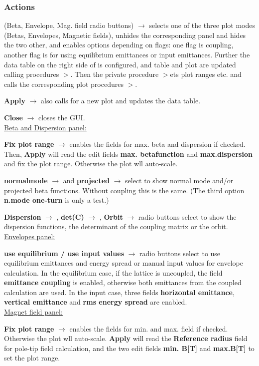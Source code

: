 \documentclass[12pt]{article}
\newcommand\code[1]{{\tt #1}}
\newcommand{\ofld}[1]{\colorbox{black!15}{{\bf #1}}}
\newcommand{\ofldx}[1]{\colorbox{black!15}{(#1)}}
\newcommand\guico[1]{{\color{blue}\code{#1}}}
\newcommand{\unico}[1]{{\color{burntorange}\code{#1}}}
\newcommand{\evcod}[2]{\ofld{#1} $\rightarrow$ \guico{#2}}
\newcommand{\evcodx}[2]{\ofldx{#1} $\rightarrow$ \guico{#2}}
\newcommand{\prcod}[2]{\opauni{#1}$>$\unico{#2}}
\newcommand{\opagui}[1]{\colorbox{blue!20}{{\color{black}\code{#1}}}}
\newcommand{\ogui}[1]{\hyperref[#1]{\opagui{#1}}}
\newcommand{\opauni}[1]{\colorbox{orange!30}{{\color{black}\code{#1}}}}
\newcommand{\act}[1]{\subsubsection*{Actions} #1}
\begin{document}
\act{
\evcodx{Beta, Envelope, Mag. field radio buttons}{rmodClick} selects one of the three plot modes (Betas, Envelopes, Magnetic fields), unhides the corresponding panel and hides the two other, and enables options depending on flags: one flag is coupling, another flag is for using equilibrium emittances or input emittances. Further the data table on the right side of \ogui{opalinop} is configured, and table and plot are updated calling procedures \prcod{linoplib}{InitBetaTab,FillBetaTab}. Then the private procedure \prcod{MakePlot} sets plot ranges etc. and calls the corresponding plot procedures \prcod{linoplib}{PlotBeta,EnvPlot,MagPLot}.

\evcod{Apply}{butgoClick} also calls for a new plot and updates the data table.

\evcod{Close}{butcanClick} closes the GUI.\\

\underline{Beta and Dispersion panel:}

\evcod{Fix plot range}{cbxbetamaxClick} enables the fields for max. beta and dispersion if checked. Then, \ofld{Apply} will read the edit fields \ofld{max. betafunction} and \ofld{max.dispersion} and fix the plot range. Otherwise the plot wll auto-scale.

\evcod{normalmode}{chk\_betabChange} and \evcod{projected}{chk\_betxyChange} select to show normal mode and/or projected beta functions. Without coupling this is the same. (The third option \ofld{n.mode one-turn} is only a test.)

\evcod{Dispersion}{rbu\_dspChange}, \evcod{det(C)}{rbu\_cdetChange}, \evcod{Orbit}{rbu\_orbiChange} radio buttons select to show the dispersion functions, the determinant of the coupling matrix or the orbit.\\

\underline{Envelopes panel:}

\evcod{use equilibrium / use input values}{rbuClick} radio buttons select to use equilibrium emittances and energy spread or manual input values for envelope calculation. In the equilibrium case, if the lattice is uncoupled, the field \ofld{emittance coupling} is enabled, otherwise both emittances from the coupled calculation are used. In the input case, three fields \ofld{horizontal emittance}, \ofld{vertical emittance} and \ofld{rms energy spread} are enabled.\\

\underline{Magnet field panel:}

\evcod{Fix plot range}{chk\_bfieldfixClick} enables the fields for min. and max. field if checked. Otherwise the plot wll auto-scale. \ofld{Apply} will read the \ofld{Reference radius} field for pole-tip field calculation, and the two edit fields \ofld{min. B[T]} and \ofld{max.B[T]} to set the plot range. 

}
\end{document}

